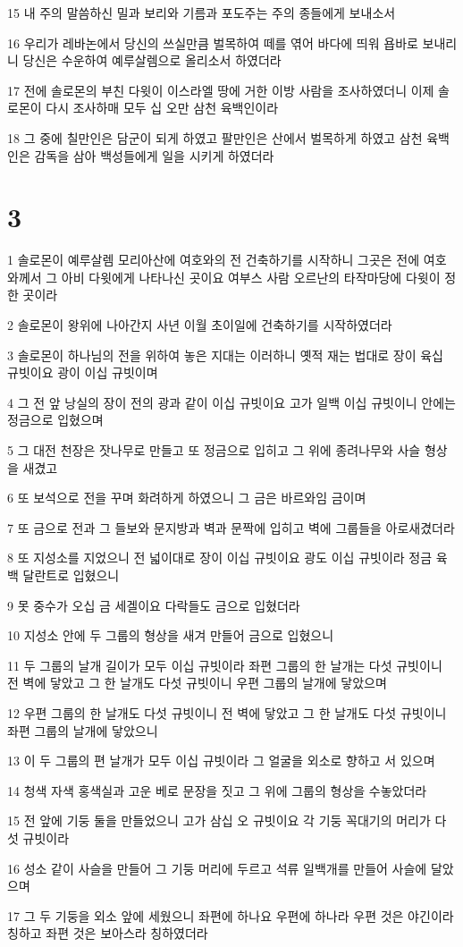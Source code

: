 \par 15 내 주의 말씀하신 밀과 보리와 기름과 포도주는 주의 종들에게 보내소서
\par 16 우리가 레바논에서 당신의 쓰실만큼 벌목하여 떼를 엮어 바다에 띄워 욥바로 보내리니 당신은 수운하여 예루살렘으로 올리소서 하였더라
\par 17 전에 솔로몬의 부친 다윗이 이스라엘 땅에 거한 이방 사람을 조사하였더니 이제 솔로몬이 다시 조사하매 모두 십 오만 삼천 육백인이라
\par 18 그 중에 칠만인은 담군이 되게 하였고 팔만인은 산에서 벌목하게 하였고 삼천 육백인은 감독을 삼아 백성들에게 일을 시키게 하였더라

\chapter{3}

\par 1 솔로몬이 예루살렘 모리아산에 여호와의 전 건축하기를 시작하니 그곳은 전에 여호와께서 그 아비 다윗에게 나타나신 곳이요 여부스 사람 오르난의 타작마당에 다윗이 정한 곳이라
\par 2 솔로몬이 왕위에 나아간지 사년 이월 초이일에 건축하기를 시작하였더라
\par 3 솔로몬이 하나님의 전을 위하여 놓은 지대는 이러하니 옛적 재는 법대로 장이 육십 규빗이요 광이 이십 규빗이며
\par 4 그 전 앞 낭실의 장이 전의 광과 같이 이십 규빗이요 고가 일백 이십 규빗이니 안에는 정금으로 입혔으며
\par 5 그 대전 천장은 잣나무로 만들고 또 정금으로 입히고 그 위에 종려나무와 사슬 형상을 새겼고
\par 6 또 보석으로 전을 꾸며 화려하게 하였으니 그 금은 바르와임 금이며
\par 7 또 금으로 전과 그 들보와 문지방과 벽과 문짝에 입히고 벽에 그룹들을 아로새겼더라
\par 8 또 지성소를 지었으니 전 넓이대로 장이 이십 규빗이요 광도 이십 규빗이라 정금 육백 달란트로 입혔으니
\par 9 못 중수가 오십 금 세겔이요 다락들도 금으로 입혔더라
\par 10 지성소 안에 두 그룹의 형상을 새겨 만들어 금으로 입혔으니
\par 11 두 그룹의 날개 길이가 모두 이십 규빗이라 좌편 그룹의 한 날개는 다섯 규빗이니 전 벽에 닿았고 그 한 날개도 다섯 규빗이니 우편 그룹의 날개에 닿았으며
\par 12 우편 그룹의 한 날개도 다섯 규빗이니 전 벽에 닿았고 그 한 날개도 다섯 규빗이니 좌편 그룹의 날개에 닿았으니
\par 13 이 두 그룹의 편 날개가 모두 이십 규빗이라 그 얼굴을 외소로 향하고 서 있으며
\par 14 청색 자색 홍색실과 고운 베로 문장을 짓고 그 위에 그룹의 형상을 수놓았더라
\par 15 전 앞에 기둥 둘을 만들었으니 고가 삼십 오 규빗이요 각 기둥 꼭대기의 머리가 다섯 규빗이라
\par 16 성소 같이 사슬을 만들어 그 기둥 머리에 두르고 석류 일백개를 만들어 사슬에 달았으며
\par 17 그 두 기둥을 외소 앞에 세웠으니 좌편에 하나요 우편에 하나라 우편 것은 야긴이라 칭하고 좌편 것은 보아스라 칭하였더라

